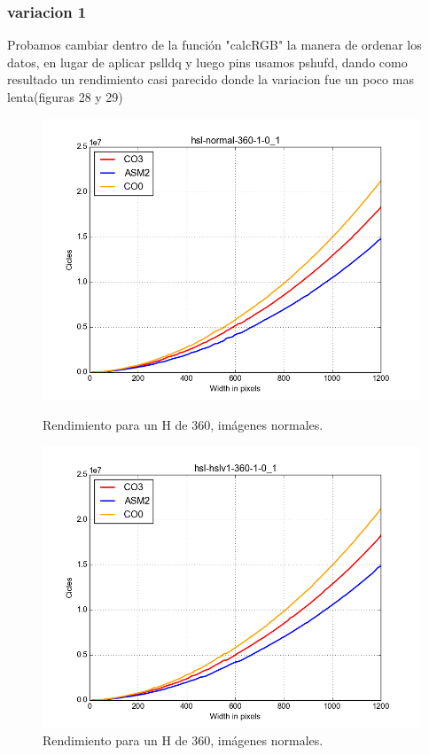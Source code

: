 \documentclass[a4paper]{article}
\begin{document}
\subsubsection{variacion 1}
Probamos cambiar dentro de la función "calcRGB" la manera de ordenar los datos, en lugar de aplicar pslldq y luego pins usamos pshufd, dando como resultado un rendimiento casi parecido donde la variacion fue un poco mas lenta(figuras 28 y 29)

\begin{figure}[H]
  \begin{center}
    \includegraphics[scale=0.4]{imagenes/hsl5.png}
    \caption{Rendimiento para un H de 360, imágenes normales.}
    \label{fig:exp1-1}
  \end{center}
  \endminipage\hfill
  \begin{center}
    \includegraphics[scale=0.4]{imagenes/hsl8.png}
    \caption{Rendimiento para un H de 360, imágenes normales.}
    \label{fig:exp1-0.5}
  \end{center}
  \endminipage\hfill
\end{figure}
\end{document}
